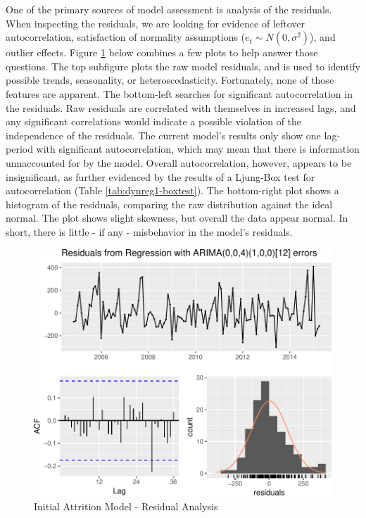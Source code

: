 \documentclass[12pt,letterpaper,toc=flat,oneside]{report}
\theoremstyle{definition}
\theoremstyle{definition}
\theoremstyle{definition}
\theoremstyle{remark}
\begin{document}
One of the primary sources of model assessment is analysis of the
residuals. When inspecting the residuals, we are looking for evidence of
leftover autocorrelation, satisfaction of normality assumptions
(\(e_t \sim N(0,\sigma^2)\)), and outlier effects. Figure
\ref{fig:dynreg1-resid} below combines a few plots to help answer those
questions. The top subfigure plots the raw model residuals, and is used
to identify possible trends, seasonality, or heteroscedasticity.
Fortunately, none of those features are apparent. The bottom-left
searches for significant autocorrelation in the residuals. Raw residuals
are correlated with themselves in increased lags, and any significant
correlations would indicate a possible violation of the independence of
the residuals. The current model's results only show one lag-period with
significant autocorrelation, which may mean that there is information
unnaccounted for by the model. Overall autocorrelation, however, appears
to be insignificant, as further evidenced by the results of a Ljung-Box
test for autocorrelation (Table \ref{tab:dynreg1-boxtest}). The
bottom-right plot shows a histogram of the residuals, comparing the raw
distribution against the ideal normal. The plot shows slight skewness,
but overall the data appear normal. In short, there is little - if any -
misbehavior in the model's residuals.

\begin{figure}[H]

{\centering \includegraphics{elliott-econometric-personnel-retention-18_files/figure-latex/dynreg1-resid-1} 

}

\caption{Initial Attrition Model - Residual Analysis}\label{fig:dynreg1-resid}
\end{figure}
\end{document}

